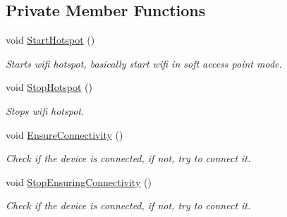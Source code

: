 \subsection*{Private Member Functions}
\begin{DoxyCompactItemize}
\item 
void \hyperlink{classConnectivity_af7622ce70021dd32fd1ba18f62f4df62}{Start\+Hotspot} ()
\begin{DoxyCompactList}\small\item\em Starts wifi hotspot, basically start wifi in soft access point mode. \end{DoxyCompactList}\item 
void \hyperlink{classConnectivity_aaa9ca6a4b59d47cd1135101af1056a22}{Stop\+Hotspot} ()
\begin{DoxyCompactList}\small\item\em Stops wifi hotspot. \end{DoxyCompactList}\item 
void \hyperlink{classConnectivity_ac97b309654c5c550f430c5cb45850d29}{Ensure\+Connectivity} ()
\begin{DoxyCompactList}\small\item\em Check if the device is connected, if not, try to connect it. \end{DoxyCompactList}\item 
void \hyperlink{classConnectivity_a8d01492828472cc2edf8af89682b40e9}{Stop\+Ensuring\+Connectivity} ()
\begin{DoxyCompactList}\small\item\em Check if the device is connected, if not, try to connect it. \end{DoxyCompactList}\end{DoxyCompactItemize}
